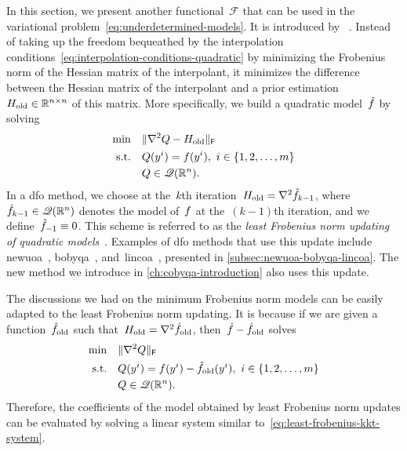 In this section, we present another functional~$\mathcal{F}$ that can be used in the variational problem~\cref{eq:underdetermined-models}.
It is introduced by \citeauthor{Powell_2004b}~\cite{Powell_2004b}.
Instead of taking up the freedom bequeathed by the interpolation conditions~\cref{eq:interpolation-conditions-quadratic} by minimizing the Frobenius norm of the Hessian matrix of the interpolant, it minimizes the difference between the Hessian matrix of the interpolant and a prior estimation~$H_{\text{old}} \in \mathbb{R}^{n \times n}$ of this matrix.
More specifically, we build a quadratic model~$\objm$ by solving
\begin{subequations}
    \label{eq:symmetric-broyden-models}
    \begin{align}
        \min        & \quad \lVert\nabla^2 Q - H_{\text{old}}\rVert_{\mathsf{F}}\\
        \text{s.t.} & \quad Q(y^i) = f(y^i), ~ i \in \{1, 2, \dots, m\}\\
                    & \quad Q \in \mathscr{Q}(\mathbb{R}^n).
    \end{align}
\end{subequations}
In a \gls{dfo} method, we choose at the~$k$th iteration~$H_{\text{old}} = \nabla^2 \objm[k - 1]$, where~$\objm[k - 1] \in \qpoly$ denotes the model of~$f$ at the~$(k - 1)$th iteration, and we define~$\objm[-1] \equiv 0$.
This scheme is referred to as the \emph{least Frobenius norm updating of quadratic models}~\cite{Powell_2004b}.
Examples of \gls{dfo} methods that use this update include \gls{newuoa}~\cite{Powell_2006}, \gls{bobyqa}~\cite{Powell_2009}, and~\gls{lincoa}~\cite{Powell_2015}, presented in \cref{subsec:newuoa-bobyqa-lincoa}.
The new method we introduce in \cref{ch:cobyqa-introduction} also uses this update.

The discussions we had on the minimum Frobenius norm models can be easily adapted to the least Frobenius norm updating.
It is because if we are given a function~$\objm[\text{old}]$ such that~$H_{\text{old}} = \nabla^2 \objm[\text{old}]$, then~$\objm - \objm[\text{old}]$ solves
\begin{align*}
    \min        & \quad \norm{\nabla^2 Q}_{\mathsf{F}}\\
    \text{s.t.} & \quad Q(y^i) = \obj(y^i) - \objm[\text{old}](y^i), ~ i \in \set{1, 2, \dots, m}\\
                & \quad Q \in \qpoly.
\end{align*}
Therefore, the coefficients of the model obtained by least Frobenius norm updates can be evaluated by solving a linear system similar to~\cref{eq:least-frobenius-kkt-system}.

